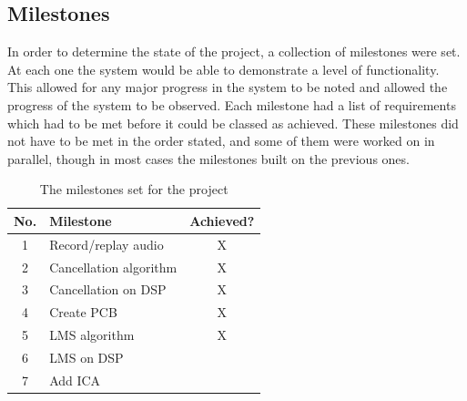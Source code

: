 \subsection{Milestones}
In order to determine the state of the project, a collection of milestones were set.
At each one the system would be able to demonstrate a level of functionality.
This allowed for any major progress in the system to be noted and allowed the progress of the system to be observed.
Each milestone had a list of requirements which had to be met before it could be classed as achieved.
These milestones did not have to be met in the order stated, and some of them were worked on in parallel, though in most cases the milestones built on the previous ones.

\begin{table}[H]
	\centering
	\begin{tabular}[c]{| c | l | c |}
		\hline
		No.	& Milestone		& Achieved? \\
		\hline
		1	& Record/replay audio	& X \\
		2	& Cancellation algorithm & X \\
		3	& Cancellation on DSP	& X \\
		4	& Create PCB		& X \\
		5	& LMS algorithm		& X \\
		6	& LMS on DSP		& \\
		7	& Add ICA		& \\
		\hline
	\end{tabular}
	\caption{The milestones set for the project}
	\label{tab:milestones}
\end{table}
